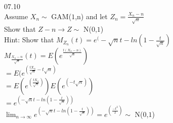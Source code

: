 

07.10\\
Assume $X_{n}\sim$ GAM($1$,n) and let $Z_{n} = \frac{X_{n} - n}{\sqrt{n}}$\\
Show that $Z-{n} \rightarrow Z\sim$ N($0$,$1$)\\
Hint: Show that $M_{Z_{n}}(t) = e^(-\sqrt{n}t - ln(1-\frac{t}{\sqrt{n}})$\\

$M_{\frac{X_{n}-n}{\sqrt{n}}}(t) = E(e^\frac{t(X_{n}-n)}{\sqrt{n}})$\\
    $=E(e^(\frac{tX_{n}}{\sqrt{n}}-t\sqrt{n})$\\
    $=E(e^(\frac{tX_{n}}{\sqrt{n}}))E(e^(-t\sqrt{n}))$\\
    $=e^(-\sqrt{n}t - ln(1-\frac{t}{\sqrt{n}}))$\\
    $\lim_{n\to\infty} e^(-\sqrt{n}t - ln(1-\frac{t}{\sqrt{n}})) = e^(\frac{-t^2}{2})\sim$ N($0$,$1$)\\ 
